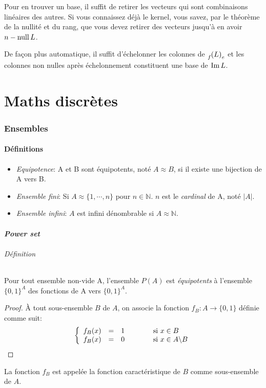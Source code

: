 Pour en trouver un base, il suffit de retirer les vecteurs qui sont
combinaisons linéaires des autres.
Si vous connaissez déjà le kernel, vous savez, par le théorème
de la nullité et du rang, que vous devez
retirer des vecteurs jusqu'à en avoir $n - \operatorname{null} L$.

De façon plus automatique, il suffit d'échelonner les colonnes de
$\fle$ et les colonnes non nulles après échelonnement constituent
une base de $\operatorname{Im} L$.

\part{Maths discrètes}

\section{Ensembles}

\subsection{Définitions}
\begin{itemize}
  \item \emph{Equipotence}: A et B sont équipotents, noté $A\approx B$,
    si il existe une bijection de A vers B.
  \item \emph{Ensemble fini}:
    Si $A \approx \{1, \cdots , n\}$ pour $n \in \mathbb{N}$.
    $n$ est le \emph{cardinal} de A, noté $|A|$.
  \item \emph{Ensemble infini}:
    $A$ est infini dénombrable si $A \approx \mathbb{N}$.
\end{itemize}

\subsection{\emph{Power set}}
\paragraph{Définition}
Pour tout ensemble non-vide A,
l'ensemble $P(A)$ est \emph{équipotents} à l'ensemble
$\{0, 1\}^{A}$ des fonctions de A vers $\{0, 1\}^{A}$.
\begin{proof}
  À tout sous-ensemble $B$ de $A$,
  on associe la fonction $f_B : A \rightarrow \{0, 1\}$ définie comme suit:
  \[
    \left \{
      \begin{array}{r c l}
        f_B(x) &=& 1 \qquad{\qquad} \text{si } x \in B\\
        f_B(x) &=& 0 \qquad{\qquad} \text{si } x \in A \backslash B
      \end{array}
    \right.
   \]
\end{proof}
La fonction $f_B$ est appelée la fonction caractéristique
de $B$ comme sous-ensemble de $A$.

